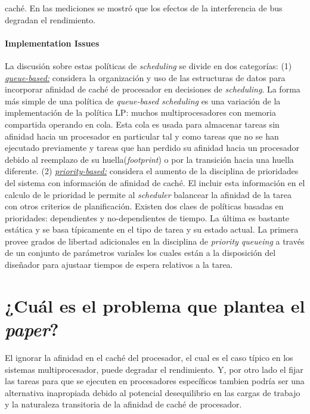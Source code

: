 caché. En las mediciones se mostró que los efectos de la interferencia de bus degradan el rendimiento. 

\paragraph{\textnormal{\textbf{Implementation Issues}}}
La discusión sobre estas políticas de \textit{scheduling} se divide en dos categorías: (1) \underline{\textit{queue-based:}} considera la organización y uso de las estructuras de datos para incorporar afinidad de caché de procesador en decisiones de \textit{scheduling}. La forma más simple de una política de \textit{queue-based scheduling} es una variación de la implementación de la política LP: muchos  multiprocesadores con memoria compartida operando en cola. Esta cola es usada para almacenar tareas sin afinidad hacia un procesador en particular tal y como tareas que no se han ejecutado previamente y tareas que han perdido su afinidad hacia un procesador debido al reemplazo de su huella(\textit{footprint}) o por la transición hacia una huella diferente. (2) \underline{\textit{priority-based:}} considera el aumento de la disciplina de prioridades del sistema con información de afinidad de caché. El incluir esta información en el calculo de le prioridad le permite al \textit{scheduler} balancear la afinidad de la tarea con otros criterios de planificación. Existen dos claes de políticas basadas en prioridades: dependientes y no-dependientes de tiempo. La última es bastante estática y se basa típicamente en el tipo de tarea y su estado actual. La primera provee grados de libertad adicionales en la disciplina de \textit{priority queueing} a través de un conjunto de parámetros variales los cuales están a la disposición del diseñador para ajustaar tiempos de espera relativos a la tarea.

\section{¿Cuál es el problema que plantea el \textit{paper}?}
El ignorar la afinidad en el caché del procesador, el cual es el caso típico en los sistemas multiprocesador, puede degradar el rendimiento. Y, por otro lado el fijar las tareas para que se ejecuten en procesadores específicos tambien podría ser una alternativa inapropiada debido al potencial desequilibrio en las cargas de trabajo y la naturaleza transitoria de la afinidad de caché de procesador.

